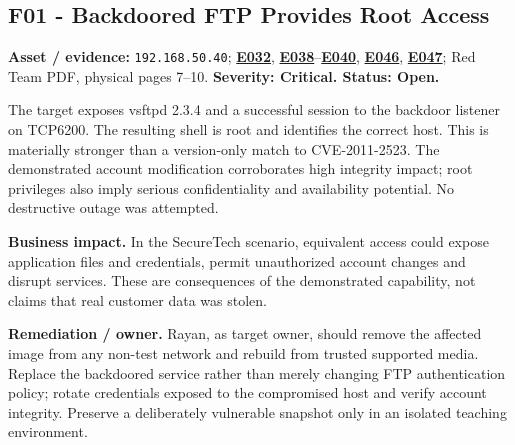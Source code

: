 \documentclass[11pt,a4paper]{article}
\newcommand{\ev}[1]{\hyperref[ev:#1]{\textbf{#1}}}
\begin{document}
\begin{center}
\end{center}

\subsection{F01 - Backdoored FTP Provides Root Access}
\label{finding:F01}
\textbf{Asset / evidence:} \texttt{192.168.50.40}; \ev{E032}, \ev{E038}--\ev{E040}, \ev{E046}, \ev{E047}; Red Team PDF, physical pages 7--10. \textbf{Severity: Critical. Status: Open.}

The target exposes vsftpd 2.3.4 and a successful session to the backdoor listener on TCP6200. The resulting shell is root and identifies the correct host. This is materially stronger than a version-only match to CVE-2011-2523. The demonstrated account modification corroborates high integrity impact; root privileges also imply serious confidentiality and availability potential. No destructive outage was attempted.

\textbf{Business impact.} In the SecureTech scenario, equivalent access could expose application files and credentials, permit unauthorized account changes and disrupt services. These are consequences of the demonstrated capability, not claims that real customer data was stolen.

\textbf{Remediation / owner.} Rayan, as target owner, should remove the affected image from any non-test network and rebuild from trusted supported media. Replace the backdoored service rather than merely changing FTP authentication policy; rotate credentials exposed to the compromised host and verify account integrity. Preserve a deliberately vulnerable snapshot only in an isolated teaching environment.
\end{document}
